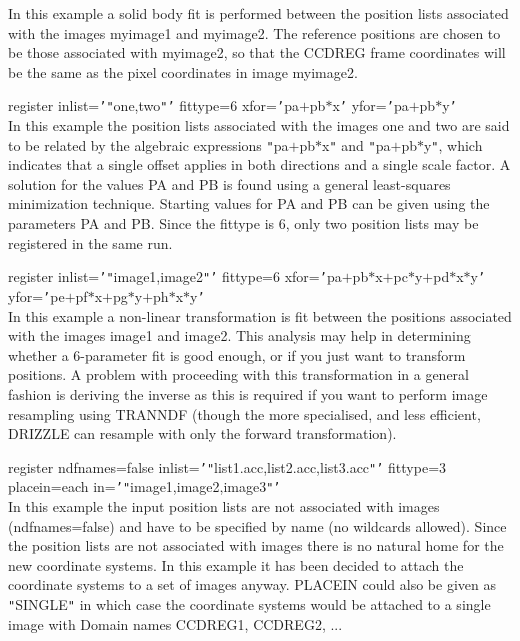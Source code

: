 \documentclass[twoside,11pt]{article}
\renewcommand{\_}{\texttt{\symbol{95}}}
\newcommand{\sstexamplesubsection}[2]{\sloppy \item{\ssttt #1} \mbox{} \\ #2 }
\newcommand{\sstnotes}[1]{\item[Notes:] \mbox{} \\[1.3ex] #1}
\newcommand{\sstitemlist}[1]{
  \mbox{} \\
  \vspace{-3.5ex}
  \begin{itemize}
     #1
  \end{itemize}
}
\newcommand{\sstexamplesubsection}[2]{\item[{\ssttt #1}] #2}
\newcommand{\sstnotes}[1]{\item[Notes:] #1 }
\newcommand{\sstitemlist}[1]{
      \begin{itemize}
         #1
      \end{itemize}
      \\
   }
\begin{document}
{{{      } {
         In this example a solid body fit is performed between the
         position lists associated with the images myimage1 and myimage2.
         The reference positions are chosen to be those associated with
         myimage2, so that the CCD\_REG frame coordinates will be the
         same as the pixel coordinates in image myimage2.
      }
      \sstexamplesubsection{
         register inlist={\tt '}{\tt "}one,two{\tt "}{\tt '} fittype=6 xfor={\tt '}pa$+$pb$*$x{\tt '} yfor={\tt '}pa$+$pb$*$y{\tt '}
      }{ 
         In this example the position lists associated with the images
         one and two are said to be related by the algebraic
         expressions {\tt "}pa$+$pb$*$x{\tt "} and {\tt "}pa$+$pb$*$y{\tt "}, which indicates that a
         single offset applies in both directions and a single scale
         factor. A solution for the values PA and PB is found using a
         general least-squares minimization technique. Starting values
         for PA and PB can be given using the parameters PA and PB.
         Since the fittype is 6, only two position lists may be
         registered in the same run.
      }
      \sstexamplesubsection{
         register inlist={\tt '}{\tt "}image1,image2{\tt "}{\tt '} fittype=6 xfor={\tt '}pa$+$pb$*$x$+$pc$*$y$+$pd$*$x$*$y{\tt '}
               yfor={\tt '}pe$+$pf$*$x$+$pg$*$y$+$ph$*$x$*$y{\tt '}
      }{
         In this example a non-linear transformation is fit between the
         positions associated with the images image1 and image2. This analysis
         may help in determining whether a 6-parameter fit is good
         enough, or if you just want to transform positions. A problem
         with proceeding with this transformation in a general fashion
         is deriving the inverse as this is required if you want to
         perform image resampling using TRANNDF (though the more
         specialised, and less efficient, DRIZZLE can resample with
         only the forward transformation).
      }
      \sstexamplesubsection{
         register ndfnames=false inlist={\tt '}{\tt "}list1.acc,list2.acc,list3.acc{\tt "}{\tt '}
               fittype=3 placein=each in={\tt '}{\tt "}image1,image2,image3{\tt "}{\tt '}
      }{
         In this example the input position lists are not associated
         with images (ndfnames=false) and have to be specified by name
         (no wildcards allowed). Since the position lists are not
         associated with images there is no natural home for the
         new coordinate systems. In this example it has been decided to
         attach the coordinate systems to a set of images anyway.
         PLACEIN could also be given as {\tt "}SINGLE{\tt "} in which case the
         coordinate systems would be attached to a single image with
         Domain names CCD\_REG\_1, CCD\_REG\_2, ...
      }
   }
   \sstnotes{
      \sstitemlist{

}}}
\end{document}
